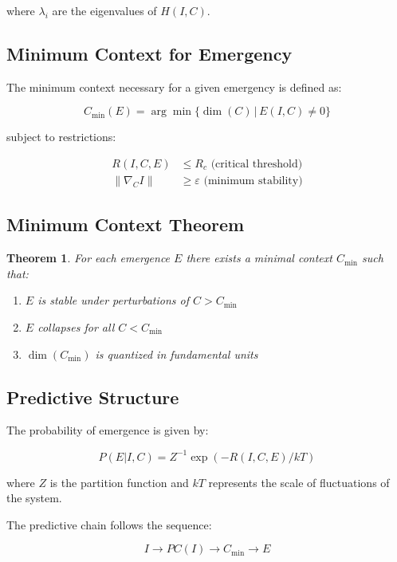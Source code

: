 \documentclass{article}
\begin{document}
where $\lambda_i$ are the eigenvalues of $H(I,C)$.

\subsection{Minimum Context for Emergency}
The minimum context necessary for a given emergency is defined as:

\begin{equation}
    C_{\text{min}}(E) = \arg\min\{\dim(C) \,|\, E(I,C) \neq 0\}
\end{equation}

subject to restrictions:

\begin{align}
    R(I,C,E) &\leq R_c \text{ (critical threshold)} \\
    \|\nabla_C I\| &\geq \varepsilon \text{ (minimum stability)}
\end{align}

\subsection{Minimum Context Theorem}\label{subsec:TContextoMinimo}
\newtheorem{theorem}{Theorem}
\begin{theorem}
For each emergence $E$ there exists a minimal context $C_{\text{min}}$ such that:
\begin{enumerate}
\item $E$ is stable under perturbations of $C > C_{\text{min}}$
\item $E$ collapses for all $C < C_{\text{min}}$
\item $\dim(C_{\text{min}})$ is quantized in fundamental units
\end{enumerate}
\end{theorem}

\subsection{Predictive Structure}
The probability of emergence is given by:

\begin{equation}
    P(E|I,C) = Z^{-1}\exp(-R(I,C,E)/kT)
\end{equation}

where $Z$ is the partition function and $kT$ represents the scale of fluctuations of the system.

The predictive chain follows the sequence:

\begin{equation}
    I \rightarrow PC(I) \rightarrow C_{\text{min}} \rightarrow E
\end{equation}
\end{document}
